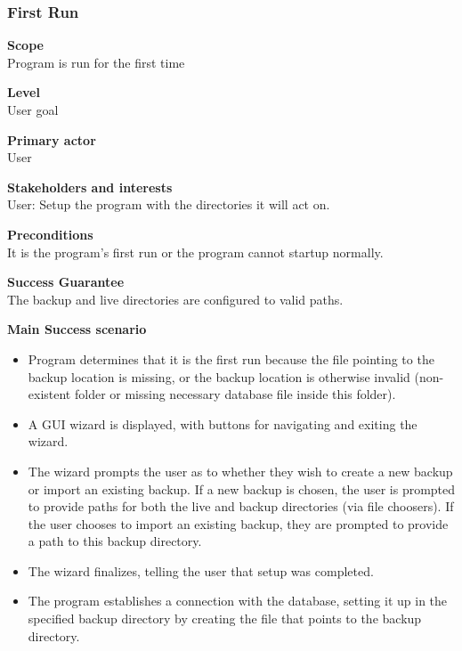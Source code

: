 \documentclass[12pt,a4paper]{article}
\begin{document}
\subsubsection{First Run}
\begin{description}
	\item \textbf{Scope} \\
		Program is run for the first time 
	\item \textbf{Level} \\
		User goal
	\item \textbf{Primary actor} \\
		User 
	\item \textbf{Stakeholders and interests} \\
		User: Setup the program with the directories it will act on.
	\item \textbf{Preconditions} \\
		It is the program's first run or the program cannot startup normally. 
	\item \textbf{Success Guarantee} \\
		The backup and live directories are configured to valid paths.
	\item \textbf{Main Success scenario} \vspace{-4ex} \\
	\begin{itemize}
		\item Program determines that it is the first run because the file pointing to the backup location is missing, or the backup location is otherwise invalid (non-existent folder or missing necessary database file inside this folder). 
		\item A GUI wizard is displayed, with buttons for navigating and exiting the wizard. 
		\item The wizard prompts the user as to whether they wish to create a new backup or import an existing backup. 
				If a new backup is chosen, the user is prompted to provide paths for both the live and backup directories (via file choosers). 
				If the user chooses to import an existing backup, they are prompted to provide a path to this backup directory. 
		\item The wizard finalizes, telling the user that setup was completed. 
		\item The program establishes a connection with the database, setting it up in the specified backup directory by creating the file that points to the backup directory. 
	\end{itemize}

\end{description}
\end{document}
